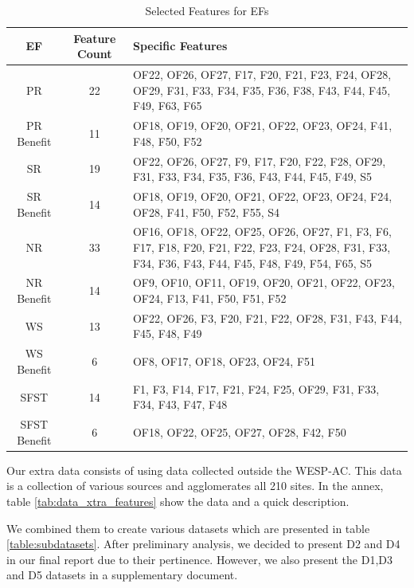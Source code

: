 \documentclass[12pt,letterpaper]{article}
\begin{document}
 \begin{table}[h]
    \centering
    \begin{tabular}{|c|c|m{8cm}|}
        \hline
        \textbf{EF} & \textbf{Feature Count} & \textbf{Specific Features} \\
        \hline
       \ac{PR} & 22 & OF22, OF26, OF27, F17, F20, F21, F23, F24, OF28, OF29, F31, F33, F34, F35, F36, F38, F43, F44, F45, F49, F63, F65 \\
        \hline
       \ac{PR} Benefit & 11 & OF18, OF19, OF20, OF21, OF22, OF23, OF24, F41, F48, F50, F52 \\
        \hline
       \ac{SR} & 19 & OF22, OF26, OF27, F9, F17, F20, F22, F28, OF29, F31, F33, F34, F35, F36, F43, F44, F45, F49, S5 \\
        \hline
       \ac{SR} Benefit & 14 & OF18, OF19, OF20, OF21, OF22, OF23, OF24, F24, OF28, F41, F50, F52, F55, S4 \\
        \hline
       \ac{NR} & 33 & OF16, OF18, OF22, OF25, OF26, OF27, F1, F3, F6, F17, F18, F20, F21, F22, F23, F24, OF28, F31, F33, F34, F36, F43, F44, F45, F48, F49, F54, F65, S5 \\
        \hline
       \ac{NR} Benefit & 14 & OF9, OF10, OF11, OF19, OF20, OF21, OF22, OF23, OF24, F13, F41, F50, F51, F52 \\
        \hline
       \ac{WS} & 13 & OF22, OF26, F3, F20, F21, F22, OF28, F31, F43, F44, F45, F48, F49 \\
        \hline
       \ac{WS} Benefit & 6 & OF8, OF17, OF18, OF23, OF24, F51 \\
        \hline
       \ac{SFST} & 14 & F1, F3, F14, F17, F21, F24, F25, OF29, F31, F33, F34, F43, F47, F48 \\
        \hline
       \ac{SFST} Benefit & 6 & OF18, OF22, OF25, OF27, OF28, F42, F50 \\
        \hline
    \end{tabular}
    \caption{Selected Features for EFs}
    \label{tab:data_spec_features}
\end{table}

Our extra data consists of using data collected outside the WESP-AC.
This data is a collection of various sources and agglomerates all 210 sites.
In the annex, table \ref{tab:data_xtra_features} show the data and a quick description.



We combined them to create various datasets which are presented in table \ref{table:subdatasets}.
After preliminary analysis, we decided to present D2 and D4 in our final report due to their pertinence.
However, we also present the D1,D3 and D5 datasets in a supplementary document.
\end{document}
